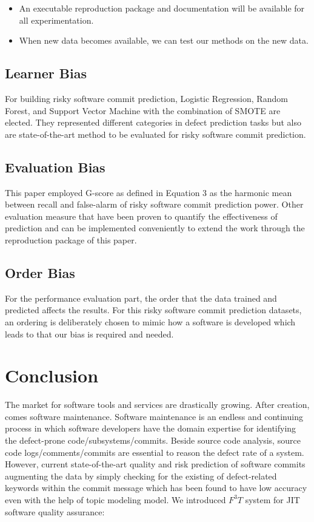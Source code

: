 \documentclass[10pt,conference]{IEEEtran}
\newcommand{\bi}{\begin{itemize}[leftmargin=0.4cm]}
\newcommand{\ei}{\end{itemize}}
\begin{document}
\bi
\item An executable reproduction package and documentation will be available for all experimentation. 
\item When new data becomes available, we can test our methods on the new data. 
\ei



\subsection{Learner Bias}

For building risky software commit prediction, Logistic Regression, Random Forest, and Support Vector Machine with the combination of SMOTE are elected. They represented different categories in defect prediction tasks but also are state-of-the-art method to be evaluated for risky software commit prediction. 

\subsection{Evaluation Bias}

This paper employed G-score as defined in Equation 3 as the harmonic mean between recall and false-alarm of risky software commit prediction power. Other evaluation measure that have been proven to quantify the effectiveness of prediction \cite{} and can be implemented conveniently to extend the work through the reproduction package of this paper.   

\subsection{Order Bias}

For the performance evaluation part, the order that the data trained and predicted affects the results.
For this risky software commit prediction datasets, an ordering is deliberately chosen to mimic how a software is developed which leads to that our bias is required and needed. 

\section{Conclusion}

The market for software tools and services are drastically growing. After creation, comes software maintenance. Software maintenance is an endless and continuing process in which software developers have the domain expertise for identifying the defect-prone code/subsystems/commits. Beside source code analysis, source code logs/comments/commits are essential to reason the defect rate of a system. However, current state-of-the-art quality and risk prediction of software commits augmenting the data by simply checking for the existing of defect-related keywords within the commit message which has been found to have low accuracy even with the help of topic modeling model. We introduced $F^3T$ system for JIT software quality assurance:
\end{document}
